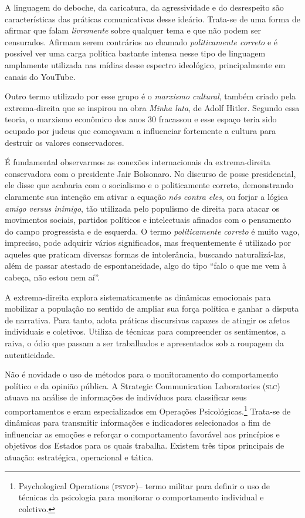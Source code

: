A linguagem do deboche, da caricatura, da agressividade e do desrespeito
são características das práticas comunicativas desse ideário. Trata-se
de uma forma de afirmar que falam \textit{livremente} sobre qualquer tema e
que não podem ser censurados. Afirmam serem contrários ao chamado
\textit{politicamente correto} e é possível ver uma carga política bastante
intensa nesse tipo de linguagem amplamente utilizada nas mídias desse
espectro ideológico, principalmente em canais do YouTube.

Outro termo utilizado por esse grupo é o \textit{marxismo cultural}, também
criado pela extrema-direita que se inspirou na obra \textit{Minha luta},
de Adolf Hitler. Segundo essa teoria, o marxismo econômico dos anos 30
fracassou e esse espaço teria sido ocupado por judeus que começavam a
influenciar fortemente a cultura para destruir os valores conservadores.

É fundamental observarmos as conexões internacionais da extrema-direita
conservadora com o presidente Jair Bolsonaro. No discurso de posse
presidencial, ele disse que acabaria com o socialismo e o politicamente
correto, demonstrando claramente sua intenção em ativar a equação \textit{nós
contra eles}, ou forjar a lógica \textit{amigo versus inimigo}, tão utilizada
pelo populismo de direita para atacar os movimentos sociais, partidos
políticos e intelectuais afinados com o pensamento do campo progressista
e de esquerda. O termo \textit{politicamente correto} é muito vago,
impreciso, pode adquirir vários significados, mas frequentemente é
utilizado por aqueles que praticam diversas formas de intolerância,
buscando naturalizá-las, além de passar atestado de espontaneidade, algo
do tipo ``falo o que me vem à cabeça, não estou nem aí''.

A extrema-direita explora sistematicamente as dinâmicas emocionais para
mobilizar a população no sentido de ampliar sua força política e ganhar
a disputa de narrativa. Para tanto, adota práticas discursivas capazes
de atingir os afetos individuais e coletivos. Utiliza de técnicas para
compreender os sentimentos, a raiva, o ódio que passam a ser trabalhados
e apresentados sob a roupagem da autenticidade.

Não é novidade o uso de métodos para o monitoramento do comportamento
político e da opinião pública. A Strategic Communication Laboratories
(\textsc{slc}) atuava na análise de informações de indivíduos para classificar
seus comportamentos e eram especializados em Operações Psicológicas.\footnote{Psychological Operations (\textsc{psyop})-- termo militar para definir o uso de técnicas da psicologia
para monitorar o comportamento individual e coletivo.} Trata-se de
dinâmicas para transmitir informações e indicadores selecionados a fim
de influenciar as emoções e reforçar o comportamento favorável aos
princípios e objetivos dos Estados para os quais trabalha. Existem três
tipos principais de atuação: estratégica, operacional e tática.

